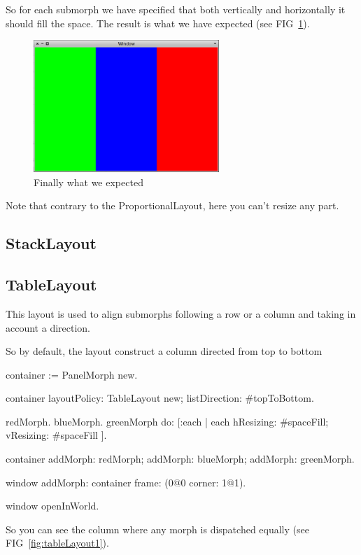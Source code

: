 \documentclass[a4paper,10pt,twoside]{book}
\begin{document}
So for each submorph we have specified that both vertically and horizontally it should fill the space.
The result is what we have expected (see FIG~\ref{fig:rowLayout3}).

\begin{figure}[ht]\centering
	\includegraphics[width=7cm]{RowLayout3}
	\caption{Finally what we expected}
	\label{fig:rowLayout3}
\end{figure}

Note that contrary to the ProportionalLayout, here you can't resize any part.

\subsection{StackLayout}


\subsection{TableLayout}

This layout is used to align submorphs following a row or a column and taking in account a direction.

So by default, the layout construct a column directed from top to bottom
\begin{code}{}
container := PanelMorph new.

container 
	layoutPolicy: TableLayout new;
	listDirection: #topToBottom.

{ redMorph. blueMorph. greenMorph } do: [:each |
	each 
		hResizing: #spaceFill;
		vResizing: #spaceFill ].
	
container 
	addMorph: redMorph;
	addMorph: blueMorph;
	addMorph: greenMorph.

window
	addMorph: container
	frame: (0@0 corner: 1@1).

window openInWorld.
\end{code}

So you can see the column where any morph is dispatched equally (see FIG~\ref{fig:tableLayout1}).
\end{document}
